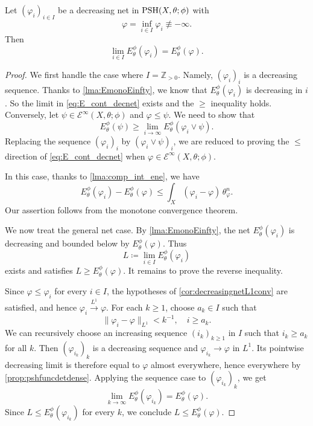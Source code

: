 \begin{proposition}\label{prop:E_cont_decnet}
    Let $(\varphi_i)_{i\in I}$ be a decreasing net in $\mathrm{PSH}(X,\theta;\phi)$ with
    \[
        \varphi=\inf_{i\in I}\varphi_i\not\equiv -\infty.
    \]
    Then
    \begin{equation}\label{eq:E_cont_decnet}
        \lim_{i\in I} E_{\theta}^{\phi}(\varphi_i)=E_{\theta}^{\phi}(\varphi).
    \end{equation}
\end{proposition}
\begin{proof}
    We first handle the case where $I=\mathbb{Z}_{>0}$. Namely, $(\varphi_i)_i$ is a decreasing sequence.
    Thanks to \cref{lma:EmonoEinfty}, we know that $E_{\theta}^{\phi}(\varphi_i)$ is decreasing in $i$. So the limit in \eqref{eq:E_cont_decnet} exists and the $\geq$ inequality holds. Conversely, let $\psi\in \mathcal{E}^{\infty}(X,\theta;\phi)$ and $\varphi\leq \psi$. We need to show that
    \[
    E_{\theta}^{\phi}(\psi)\geq \lim_{i\to\infty} E_{\theta}^{\phi}\left(\varphi_i\lor \psi\right).
    \]
    Replacing the sequence $(\varphi_i)_i$ by $(\varphi_i\lor\psi)_i$, we are reduced to proving the $\leq$ direction of \eqref{eq:E_cont_decnet} when $\varphi\in \mathcal{E}^{\infty}(X,\theta;\phi)$.

    In this case, thanks to \cref{lma:comp_int_ene}, we have
    \[
    E_{\theta}^{\phi}(\varphi_i)-E_{\theta}^{\phi}(\varphi)\leq \int_X (\varphi_i-\varphi)\,\theta_{\varphi}^n.
    \]
    Our assertion follows from the monotone convergence theorem.

    We now treat the general net case. By \cref{lma:EmonoEinfty}, the net $E_{\theta}^{\phi}(\varphi_i)$ is decreasing and bounded below by $E_{\theta}^{\phi}(\varphi)$. Thus
    \[
        L\coloneqq \lim_{i\in I}E_{\theta}^{\phi}(\varphi_i)
    \]
    exists and satisfies $L\geq E_{\theta}^{\phi}(\varphi)$. It remains to prove the reverse inequality.

    Since $\varphi\leq \varphi_i$ for every $i\in I$, the hypotheses of \cref{cor:decreasingnetL1conv} are satisfied, and hence $\varphi_i\xrightarrow{L^1}\varphi$. For each $k\geq 1$, choose $a_k\in I$ such that
    \[
        \|\varphi_i-\varphi\|_{L^1}<k^{-1},\quad i\geq a_k.
    \]
    We can recursively choose an increasing sequence $(i_k)_{k\geq 1}$ in $I$ such that $i_k\geq a_k$ for all $k$. Then $(\varphi_{i_k})_k$ is a decreasing sequence and $\varphi_{i_k}\to\varphi$ in $L^1$. Its pointwise decreasing limit is therefore equal to $\varphi$ almost everywhere, hence everywhere by \cref{prop:pshfuncdetdense}. Applying the sequence case to $(\varphi_{i_k})_k$, we get
    \[
        \lim_{k\to\infty}E_{\theta}^{\phi}(\varphi_{i_k})=E_{\theta}^{\phi}(\varphi).
    \]
    Since $L\leq E_{\theta}^{\phi}(\varphi_{i_k})$ for every $k$, we conclude $L\leq E_{\theta}^{\phi}(\varphi)$.
\end{proof}

